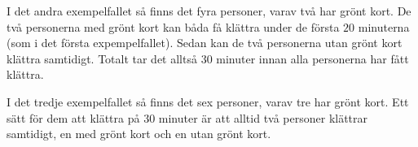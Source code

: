 I det andra exempelfallet så finns det fyra personer, varav två har grönt kort.
De två personerna med grönt kort kan båda få klättra under de första $20$ minuterna (som i det första expempelfallet).
Sedan kan de två personerna utan grönt kort klättra samtidigt.
Totalt tar det alltså $30$ minuter innan alla personerna har fått klättra.

I det tredje exempelfallet så finns det sex personer, varav tre har grönt kort.
Ett sätt för dem att klättra på $30$ minuter är att alltid två personer klättrar samtidigt, en med grönt kort och en utan grönt kort.
